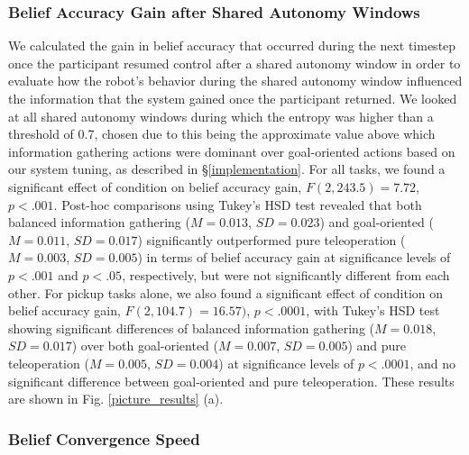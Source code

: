 \documentclass[conference]{IEEEtran}
\begin{document}
\subsubsection{Belief Accuracy Gain after Shared Autonomy Windows}
We calculated the gain in belief accuracy that occurred during the next timestep once the participant resumed control after a shared autonomy window in order to evaluate how the robot's behavior during the shared autonomy window influenced the information that the system gained once the participant returned. We looked at all shared autonomy windows during which the entropy was higher than a threshold of 0.7, chosen due to this being the approximate value above which information gathering actions were dominant over goal-oriented actions based on our system tuning, as described in \S\ref{implementation}. For all tasks, we found a significant effect of condition on belief accuracy gain, $F(2, 243.5) = 7.72$, $p < .001$. Post-hoc comparisons using Tukey's HSD test revealed that both balanced information gathering ($M = 0.013$, $SD = 0.023$) and goal-oriented ($M = 0.011$, $SD = 0.017$) significantly outperformed pure teleoperation ($M = 0.003$, $SD = 0.005$) in terms of belief accuracy gain at significance levels of $p < .001$ and $p < .05$, respectively, but were not significantly different from each other. For pickup tasks alone, we also found a significant effect of condition on belief accuracy gain, $F(2, 104.7) = 16.57)$, $p < .0001$, with Tukey's HSD test showing significant differences of balanced information gathering ($M = 0.018$, $SD = 0.017$) over both goal-oriented ($M = 0.007$, $SD = 0.005$) and pure teleoperation ($M = 0.005$, $SD = 0.004$) at significance levels of $p < .0001$,  and no significant difference between goal-oriented and pure teleoperation. These results are shown in Fig. \ref{picture_results} (a).

\subsubsection{Belief Convergence Speed}
\end{document}
